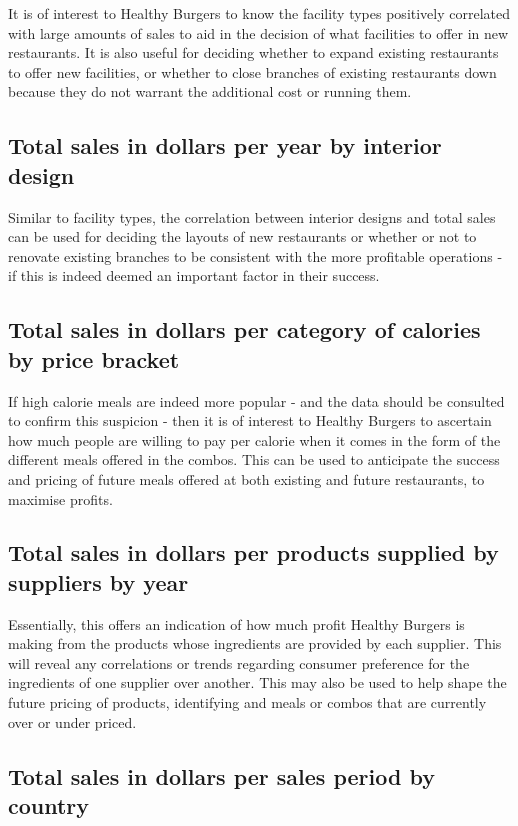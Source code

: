 \documentclass[12pt, a4paper]{article}
\begin{document}
It is of interest to Healthy Burgers to know the facility types positively correlated with large amounts of sales to aid in the decision of what facilities to offer in new restaurants. It is also useful for deciding whether to expand existing restaurants to offer new facilities, or whether to close branches of existing restaurants down because they do not warrant the additional cost or running them.

\subsection*{Total sales in dollars per year by interior design}

Similar to facility types, the correlation between interior designs and total sales can be used for deciding the layouts of new restaurants or whether or not to renovate existing branches to be consistent with the more profitable operations - if this is indeed deemed an important factor in their success.

\subsection*{Total sales in dollars per category of calories by price bracket}

If high calorie meals are indeed more popular - and the data should be consulted to confirm this suspicion - then it is of interest to Healthy Burgers to ascertain how much people are willing to pay per calorie when it comes in the form of the different meals offered in the combos. This can be used to anticipate the success and pricing of future meals offered at both existing and future restaurants, to maximise profits.

\subsection*{Total sales in dollars per products supplied by suppliers by year}

Essentially, this offers an indication of how much profit Healthy Burgers is making from the products whose ingredients are provided by each supplier. This will reveal any correlations or trends regarding consumer preference for the ingredients of one supplier over another. This may also be used to help shape the future pricing of products, identifying and meals or combos that are currently over or under priced.

\subsection*{Total sales in dollars per sales period by country}
\end{document}
